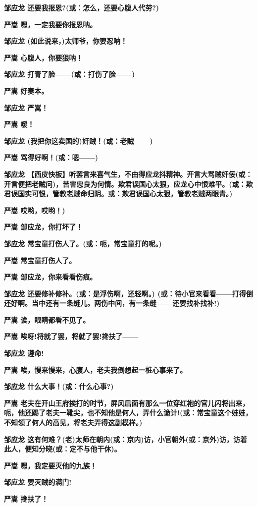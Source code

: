 \textbf{邹应龙 还要我报恩?(或：怎么，还要心腹人代劳?)}

\textbf{严嵩 嗯，一定我要你报恩呐。}

\textbf{邹应龙 (如此说来，)太师爷，你要忍呐！}

\textbf{严嵩 心腹人，你要狠呐！}

\textbf{邹应龙 打青了脸------(或：打伤了脸------)}

\textbf{严嵩 好奏本。}

\textbf{邹应龙 严嵩！}

\textbf{严嵩 嗳！}

\textbf{邹应龙 (我把你这卖国的)奸贼！(或：老贼------)}

\textbf{严嵩 骂得好啊！(或：嗯------)}

\textbf{邹应龙
【西皮快板】听罢言来喜气生，不由得应龙抖精神。开言大骂贼奸佞(或：开言便把老贼问)，苦害忠良为何情。欺君误国心太狠，应龙心中恨难平。(或：欺君误国实可恨，管教老贼命归阴。或：欺君误国心太狠，管教老贼两眼青。)}

\textbf{严嵩 哎哟，哎哟！)}

\textbf{严嵩 邹应龙，你打坏了！}

\textbf{邹应龙 常宝童打伤人了。(或：呃，常宝童打的呢。)}

\textbf{严嵩 常宝童打伤人了。}

\textbf{严嵩 邹应龙，你来看看伤痕。}

\textbf{邹应龙 还要修补修补。(或：是浮伤啊，还轻啊。)
(或：待小官来看看------打得倒还好啊。当中还有一条缝儿。两伤中间，有一条缝------还要找补找补!)}

\textbf{严嵩 诶，眼睛都看不见了。}

\textbf{严嵩 唉呀!将就了罢，将就了罢!搀扶了------}

\textbf{邹应龙 遵命!}

\textbf{严嵩 唉，慢来慢来，心腹人，老夫我倒想起一桩心事来了。}

\textbf{邹应龙 什么大事！(或：什么心事?)}

\textbf{严嵩
老夫在开山王府挨打的时节，屏风后面有那么一位穿红袍的官儿闪将出来，呃，他还踢了老夫一靴尖，也不知他是何人，弄什么诡计!(或：常宝童这个娃娃，不知领了何人的高见，将老夫弄得这副模样。)}

\textbf{邹应龙
这有何难？(老)太师在朝内(或：京内)访，小官朝外(或：京外)访，访着此人，便知分晓(或：定不与他干休)。}

\textbf{严嵩 嗯，我定要灭他的九族！}

\textbf{邹应龙 要灭贼的满门!}

\textbf{严嵩 搀扶了！}

